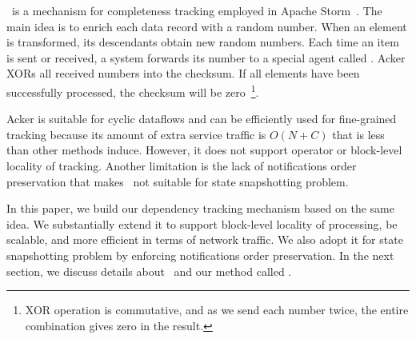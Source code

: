 \acker\ is a mechanism for completeness tracking employed in Apache Storm~\cite{apache:storm}. The main idea is to enrich each data record with a random number. When an element is transformed, its descendants obtain new random numbers. Each time an item is sent or received, a system forwards its number to a special agent called {\em \acker}. Acker XORs all received numbers into the checksum. If all elements have been successfully processed, the checksum will be zero~\footnote{XOR operation is commutative, and as we send each number twice, the entire combination gives zero in the result.}.

Acker is suitable for cyclic dataflows and can be efficiently used for fine-grained tracking because its amount of extra service traffic is $O(N+C)$ that is less than other methods induce. However, it does not support operator or block-level locality of tracking. Another limitation is the lack of notifications order preservation that makes \acker\ not suitable for state snapshotting problem.

In this paper, we build our dependency tracking mechanism based on the same idea. We substantially extend it to support block-level locality of processing, be scalable, and more efficient in terms of network traffic. We also adopt it for state snapshotting problem by enforcing notifications order preservation. In the next section, we discuss details about \acker\ and our method called \tracker .